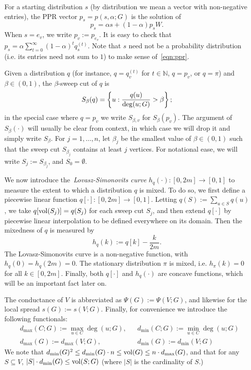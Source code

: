 For a starting distribution $s$ (by distribution we mean a vector with non-negative entries), the PPR vector $p_s = p(s,\alpha;G)$ is the solution of
\begin{equation}
\label{eqn:ppr}
p_s = \alpha s + (1 - \alpha) p_s W.
\end{equation}
When $s = e_v$, we write $p_v := p_{e_v}$. It is easy to check that $p_s = \alpha \sum_{t = 0}^{\infty} (1 - \alpha)^t q_s^{(t)}$.  Note that $s$ need not be a probability distribution (i.e. its entries need not sum to $1$) to make sense of~\eqref{eqn:ppr}.

Given a distribution $q$ (for instance, $q = q_v^{(t)}$ for $t \in \mathbb{N}$, $q = p_v$, or $q = \pi$) and $\beta \in (0,1)$, the $\beta$-sweep cut of $q$ is
\begin{equation*}
S_{\beta}(q) = \left\{u: \frac{q(u)}{\deg(u;G)} > \beta\right\};
\end{equation*} 
in the special case where $q = p_v$ we write $S_{\beta,v}$ for $S_{\beta}(p_v)$. The argument of $S_{\beta}(\cdot)$ will usually be clear from context, in which case we will drop it and simply write $S_{\beta}$. For $j = 1,\ldots,n$, let $\beta_j$ be the smallest value of $\beta \in (0,1)$ such that the sweep cut $S_{\beta_j}$ contains at least $j$ vertices. For notational ease, we will write $S_j := S_{\beta_j}$, and $S_0 = \emptyset$. 

We now introduce the~\emph{Lovasz-Simonovits curve} $h_q(\cdot): [0,2m] \to [0,1]$ to measure the extent to which a distribution $q$ is mixed. To do so, we first define a piecewise linear function $q[\cdot]: [0,2m] \to [0,1]$. Letting $q(S) := \sum_{u \in S} q(u)$, we take $q[\mathrm{vol}(S_j)] = q(S_j)$ for each sweep cut $S_j$, and then extend $q[\cdot]$ by piecewise linear interpolation to be defined everywhere on its domain. Then the mixedness of $q$ is measured by
\begin{equation*}
h_q(k) := q[k] - \frac{k}{2m}.
\end{equation*}
The Lovasz-Simonovits curve is a non-negative function, with $h_q(0) = h_q(2m) = 0$. The stationary distribution $\pi$ is mixed, i.e. $h_{\pi}(k) = 0$ for all $k \in [0,2m]$. Finally, both $q[\cdot]$ and $h_q(\cdot)$ are concave functions, which will be an important fact later on.  

The conductance of $V$ is abbreviated as $\Psi(G) := \Psi(V;G)$, and likewise for the local spread $s(G) := s(V;G)$. Finally, for convenience we introduce the following functionals:
\begin{equation*}
\begin{aligned}
& d_{\max}(C; G) := \max_{u \in C} \deg(u; G), && d_{\min}(C; G) := \min_{u \in C} \deg(u;G) \\
& d_{\max}(G) := d_{\max}(V;G),~~ && d_{\min}(G) := d_{\min}(V; G)
\end{aligned}
\end{equation*}
We note that $d_{\min}(G)^2 \leq d_{\min}(G) \cdot n \leq \mathrm{vol}(G) \leq n \cdot d_{\max}(G)$, and that for any $S \subseteq V$, $|S| \cdot d_{\min}(G) \leq \mathrm{vol}(S;G)$ (where $|S|$ is the cardinality of $S$.)

